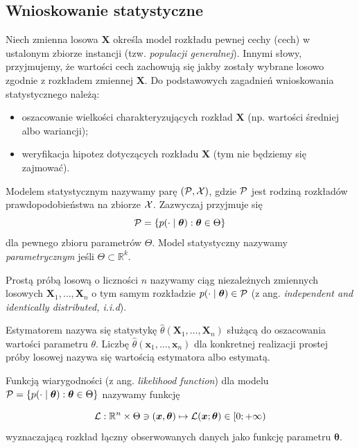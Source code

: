 \documentclass{myclass}
\numberwithin{equation}{subsection}
\begin{document}
\subsection{Wnioskowanie statystyczne}

Niech zmienna losowa \(\bm{X}\) określa model rozkładu pewnej cechy (cech) w ustalonym zbiorze
instancji (tzw. \emph{populacji generalnej}). Innymi słowy, przyjmujemy, że wartości cech zachowują
się jakby zostały wybrane losowo zgodnie z rozkładem zmiennej \(\bm{X}\). Do podstawowych zagadnień
wnioskowania statystycznego należą:
\begin{itemize}
\item oszacowanie wielkości charakteryzujących rozkład \(\bm{X}\) (np. wartości średniej albo
wariancji);
\item weryfikacja hipotez dotyczących rozkładu \(\bm{X}\) (tym nie będziemy się zajmować).
\end{itemize}

\begin{definition}
Modelem statystycznym nazywamy parę \((\mathcal{P}, \mathcal{X})\), gdzie \(\mathcal{P}\) jest rodziną rozkładów
prawdopodobieństwa na zbiorze \(\mathcal{X}\). Zazwyczaj przyjmuje się
\[
\mathcal{P} = \{p(\cdot \mid \bm{\theta}) : \bm{\theta} \in \Theta \} 
\]
dla pewnego zbioru parametrów \(\Theta\). Model statystyczny nazywamy \emph{parametrycznym} jeśli
\(\Theta \subset \mathbb{R}^k\).
\end{definition}

\begin{definition}
Prostą próbą losową o liczności \(n\) nazywamy ciąg niezależnych zmiennych losowych
\(\bm{X}_1,\ldots,\bm{X}_n\) o tym samym rozkładzie \(p(\cdot \mid \bm{\theta}) \in \mathcal{P}\) (z ang.
\textit{independent and identically distributed, i.i.d}).
\end{definition}

\begin{definition}[Estymatora]
Estymatorem nazywa się statystykę \(\hat{\theta}(\bm{X}_1,\ldots,\bm{X}_n)\) służącą do oszacowania
wartości parametru \(\theta\). Liczbę \(\hat{\theta}(\bm{x}_1,\ldots,\bm{x}_n)\) dla konkretnej
realizacji prostej próby losowej nazywa się wartością estymatora albo estymatą.
\end{definition}

\begin{definition}
Funkcją wiarygodności (z ang. \textit{likelihood function}) dla modelu \(\mathcal{P} = \{p(\cdot \mid \bm{\theta}) :
\bm{\theta} \in \Theta\}\) nazywamy funkcję

\begin{equation*}
    \mathcal{L}: \mathbb{R}^n \times \Theta \ni (\bm{x},\bm{\theta}) \mapsto \mathcal{L}(\bm{x};\bm{\theta}) \in [0; +\infty)
\end{equation*}
wyznaczającą rozkład łączny obserwowanych danych jako funkcję parametru \(\bm{\theta}\).    
\end{definition}
\end{document}
